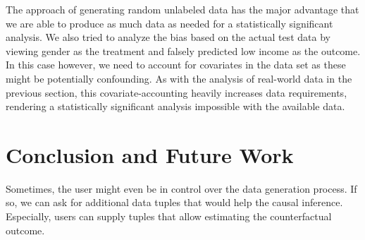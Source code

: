 \documentclass[acmsmall, nonacm, screen]{acmart} %
\begin{document}
The approach of generating random unlabeled data has the major advantage that we are able to produce as much data as needed for a statistically significant analysis.
We also tried to analyze the bias based on the actual test data by viewing gender as the treatment and falsely predicted low income as the outcome. 
In this case however, we need to account for covariates in the data set as these might be potentially confounding.
As with the analysis of real-world data in the previous section, this covariate-accounting heavily increases data requirements, rendering a statistically significant analysis impossible with the available data.


\section{Conclusion and Future Work}

Sometimes, the user might even be in control over the data generation process. 
If so, we can ask for additional data tuples that would help the causal inference. Especially, users can supply tuples that allow estimating the counterfactual outcome.\\






\end{document}
